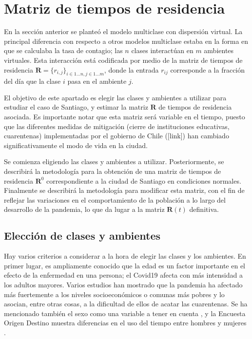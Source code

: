 \section{Matriz de tiempos de residencia}\label{met:matriz}

En la sección anterior se planteó el modelo multiclase con dispersión virtual. La principal diferencia con respecto a otros modelos multiclase estaba en la forma en que se calculaba la tasa de contagio; las \(n\) clases interactúan en \(m\) ambientes virtuales. Esta interacción está codificada por medio de la matriz de tiempos de residencia \( \mathbf{R} =\{r_{i,j}\}_{i \in 1 \dots n, j \in 1 \dots m}\), donde la entrada \(r_{ij}\) corresponde a la fracción del día que la clase \(i\) pasa en el ambiente \(j\).

El objetivo de este apartado es elegir las clases y ambientes a utilizar para estudiar el caso de Santiago, y estimar la matriz \(\mathbf{R}\) de tiempos de residencia asociada. Es importante notar que esta matriz será variable en el tiempo, puesto que las diferentes medidas de mitigación (cierre de instituciones educativas, cuarentenas) implementadas por el gobierno de Chile ([link]) han cambiado significativamente el modo de vida en la ciudad.  

Se comienza eligiendo las clases y ambientes a utilizar. Posteriormente, se describirá la metodología para la obtención de una matriz de tiempos de residencia \(\mathbf{R}^0\) correspondiente a la ciudad de Santiago en condiciones normales. Finalmente se describirá la metodología para modificar esta matriz, con el fin de reflejar las variaciones en el comportamiento de la población a lo largo del desarrollo de la pandemia, lo que da lugar a la matriz \(\mathbf{R}(t)\) definitiva.


\subsection{Elección de clases y ambientes}

Hay varios criterios a considerar a la hora de elegir las clases y los ambientes. En primer lugar, es ampliamente conocido \cite{} que la edad es un factor importante en el efecto de la enfermedad en una persona; el Covid19 afecta con más intensidad a los adultos mayores. Varios estudios \cite{} %
\cite{Mena2021}\cite{Bennett2021} han mostrado que la pandemia ha afectado más fuertemente a los niveles socioeconómicos o comunas más pobres y lo asocian, entre otras cosas, a la dificultad de ellos de acatar las cuarentenas. Se ha mencionado también el sexo como una variable a tener en cuenta \cite{}, y la Encuesta Origen Destino muestra diferencias en el uso del tiempo entre hombres y mujeres \cite{Jara-Diaz2013}.

